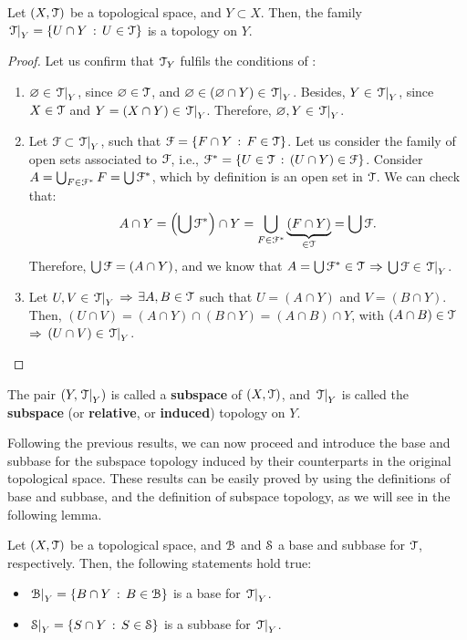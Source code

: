 \begin{theorem}
	\label{th:subspace-topology}
	Let $(X, \T)$ be a topological space, and $Y\subset X$. Then, the family
	$\Trel{Y} = \setdef{U\cap Y}{U\in\T}$ is a topology on $Y$.
\end{theorem}
\begin{proof}
Let us confirm that $\T_{Y}$ fulfils the conditions of :
	\begin{enumerate}
		\item $\emptyset\in\Trel{Y}$, since $\emptyset\in\T$, and $\emptyset\in(\emptyset\cap Y)\in \Trel{Y}$. Besides,
		$Y\in \Trel{Y}$, since $X\in\T$ and $Y=(X\cap Y)\in \Trel{Y}$. Therefore, $\emptyset, Y\in \Trel{Y}$.
		\item Let $\F\subset \Trel{Y}$, such that $\F=\setdef{F\cap Y}{F\in \T}$. Let us consider the family of
		open sets associated to $\F$, i.e., $\F^*=\setdef{U\in\T}{(U\cap Y)\in \F}$. Consider
		$A=\bigcup_{F\in\F^*}F=\bigcup \F^*$, which by definition is an open set in $\T$.
		We can check that:
		$$
		A\cap Y = \left(\bigcup\F^*\right)\cap Y=\bigcup_{F\in \F^*}\underbrace{(F\cap Y)}_{\in\T}=\bigcup \F.
		$$
		Therefore, $\bigcup \F = (A\cap Y)$, and we know that $A=\bigcup \F^* \in \T$ $\Then$ $\bigcup \F\in \Trel{Y}$.
		\item Let $U, V\in \Trel{Y}$ $\Then$ $\exists A, B\in \T$ such that $U=(A\cap Y)$ and $V=(B\cap Y)$. Then,
		$(U\cap V) = (A\cap Y)\cap(B\cap Y) = (A\cap B)\cap Y$, with $(A\cap B)\in \T$ $\Then$ $(U\cap V)\in \Trel{Y}$.
	\end{enumerate}
\end{proof}


\begin{definition}
	\label{def:subspace-topology}
	The pair $(Y, \Trel{Y})$ is called a \textbf{subspace} of $(X, \T)$,
	and $\Trel{Y}$ is called the \textbf{subspace} (or \textbf{relative}, or \textbf{induced}) {topology} on $Y$.
\end{definition}

Following the previous results, we can now proceed and introduce the base and subbase
for the subspace topology induced by their counterparts in the original topological space.
These results can be easily proved by using the definitions of base and subbase, and
the definition of subspace topology, as we will see in the following lemma.

\begin{lemma}
	\label{lem:subspace-topology-base}
	Let $(X, \T)$ be a topological space, and $\B$ and $\S$ a base and subbase for $\T$, respectively.
	Then, the following statements hold true:
	\begin{itemize}
		\item $\Rel{\B}{Y}=\setdef{B\cap Y}{B\in\B}$ is a base for $\Trel{Y}$.
		\item $\Rel{\S}{Y}=\setdef{S\cap Y}{S\in\S}$ is a subbase for $\Trel{Y}$.
	\end{itemize}
\end{lemma}

